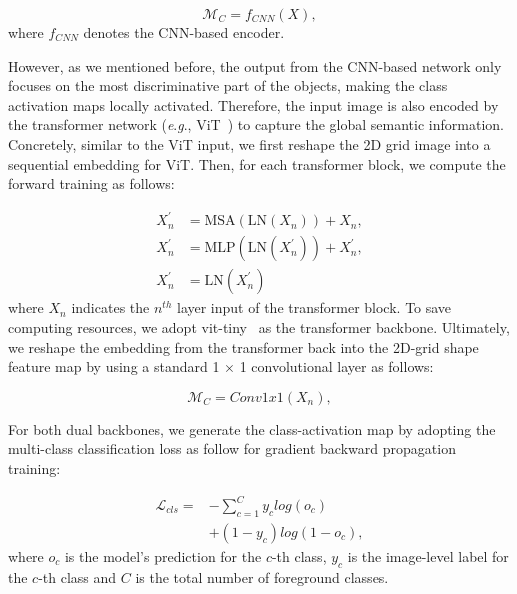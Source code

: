 \documentclass[journal]{IEEEtran}
\newcommand{\eg}{\textit{e}.\textit{g}., }
\begin{document}
\begin{equation}
\mathcal{M}_{C} = f_{CNN}(X),
\tag{1}
\label{eq1}
\end{equation}
where $f_{CNN}$ denotes the CNN-based encoder.

However, as we mentioned before, the output from the CNN-based network only focuses on the most discriminative part of the objects, making the class activation maps locally activated. Therefore, the input image is also encoded by the transformer network (\eg ViT~\cite{dosovitskiy2020image}) to capture the global semantic information. Concretely, similar to the ViT input, we first reshape the 2D grid image into a sequential embedding for ViT. Then, for each transformer block, we compute the forward training as follows:

\begin{equation}
\begin{split}
X_n^{'} &= \text{MSA}(\text{LN}(X_n)) + X_n, \\
X_n^{'} &= \text{MLP}(\text{LN}(X_n^{'})) + X_n^{'}, \\
X_n^{'} &= \text{LN}(X_n^{'})
\end{split}
\tag{2}
\label{eq2}
\end{equation}
where $X_n$ indicates the $n^{th}$ layer input of the transformer block. To save computing resources, we adopt vit-tiny~\cite{dosovitskiy2020image} as the transformer backbone.
Ultimately, we reshape the embedding from the transformer back into the 2D-grid shape feature map by using a standard 1 $\times$ 1 convolutional layer as follows:

\begin{equation}
\mathcal{M}_{C} = \textit{Conv1x1}(X_n),
\tag{3}
\label{eq3}
\end{equation}

For both dual backbones, we generate the class-activation map by adopting the multi-class classification loss as follow for gradient backward propagation training:

\begin{equation}
\begin{split}
\mathcal{L}_{cls} = &-\sum_{c=1}^{C} y_c log(o_c) \\
& + (1 - y_c) log(1- o_c),
\end{split}
\tag{4}
\label{eq4}
\end{equation}
where $o_c$ is the model’s prediction for the $c$-th class, $y_c$ is the image-level label for the $c$-th class and $C$ is the total number of foreground classes.
\end{document}
